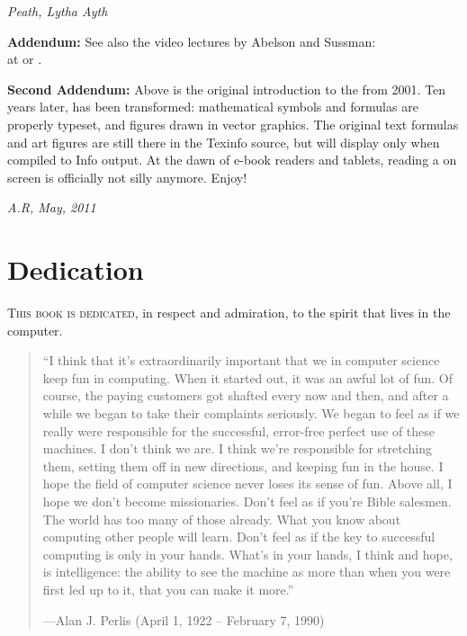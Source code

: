 \vspace{0.5em}
\noindent
\textit{Peath, Lytha Ayth}

\vspace{1.0em}
\noindent
\textbf{Addendum:} See also the  video lectures by Abelson and Sussman:\\
at \href{http://groups.csail.mit.edu/mac/classes/6.001/abelson-sussman-lectures/}{} or
\href{http://ocw.mit.edu/courses/electrical-engineering-and-computer-science/6-001-structure-and-interpretation-of-computer-programs-spring-2005/video-lectures/}{}.

\vspace{0.5em}
\noindent
\textbf{Second Addendum:} Above is the original introduction to the  from 2001.
Ten years later,  has been transformed:
mathematical symbols and formulas are properly typeset, and figures drawn in vector graphics.
The original text formulas and  art figures are still there in the Texinfo source, but will display only when compiled to Info output.
At the dawn of e-book readers and tablets, reading a  on screen is officially not silly anymore.
Enjoy!

\enlargethispage{\baselineskip}

\vspace{0.5em}
\noindent
\textit{A.R, May, 2011}

\chapter*{Dedication}
\label{Dedication}

\lettrine{T}{his book is dedicated}, in respect and admiration, to the spirit that lives in
the computer.

\begin{quote}
“I think that it’s extraordinarily important that we in computer science keep
fun in computing.
When it started out, it was an awful lot of fun.
Of course, the paying customers got shafted every now and then, and after a while we began
to take their complaints seriously.
We began to feel as if we really were responsible for the successful, error-free perfect use of these machines.
I don’t think we are.
I think we're responsible for stretching them, setting them off in new directions, and keeping fun in the house.
I hope the field of computer science never loses its sense of fun.
Above all, I hope we don’t become missionaries.
Don’t feel as if you’re Bible salesmen.
The world has too many of those already.
What you know about computing other people will learn.
Don’t feel as if the key to successful computing is only in your hands.
What’s in your hands, I think and hope, is intelligence:
the ability to see the machine as more than when you were first led up to it, that you can make it more.”

\enlargethispage{\baselineskip}

\noindent
---Alan J. Perlis (April 1, 1922 -- February 7, 1990)
\end{quote}

